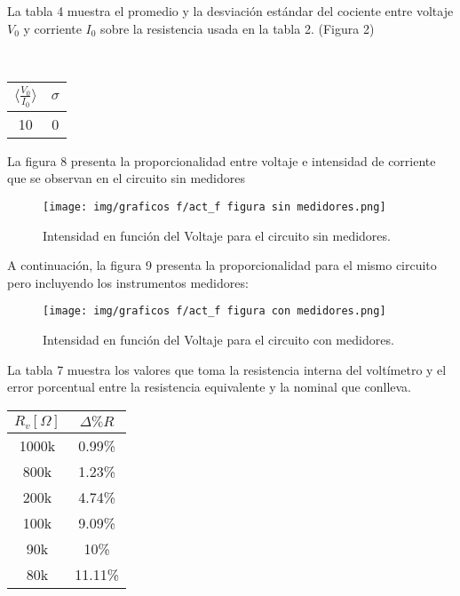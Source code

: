 \documentclass[letterpaper,11pt]{article} %
\begin{document}
La tabla 4 muestra el promedio y la desviación estándar del cociente entre voltaje $V_0$ y corriente $I_0$ sobre la resistencia usada en la tabla 2. (Figura 2)
\begin{center}
\vspace*{1mm} \\
\begin{tabular}{|c|c|}
\hline
$\langle \frac{V_0}{I_0}\rangle$ & $\sigma$ \\ \hline
10                               & 0        \\ \hline
\end{tabular}
\end{center}

La figura 8 presenta la proporcionalidad entre voltaje e intensidad de corriente que se observan en el circuito sin medidores
\begin{figure}
    \centering
    \texttt{[image: img/graficos f/act\_f figura sin medidores.png]}
    
    \caption{Intensidad en función del Voltaje para el circuito sin medidores.}
    \label{fig:my_label}
\end{figure}

A continuación, la figura 9 presenta la proporcionalidad para el mismo circuito pero incluyendo los instrumentos medidores:
\begin{figure}
    \centering
    \texttt{[image: img/graficos f/act\_f figura con medidores.png]}
    
    \caption{Intensidad en función del Voltaje para el circuito con medidores.}
    \label{fig:my_label}
\end{figure}


La tabla 7 muestra los valores que toma la resistencia interna del voltímetro y el error porcentual entre la resistencia equivalente y la nominal que conlleva.
\begin{center}
\begin{tabular}{|c|c|}
\hline
$R_v [\Omega]$ & $\Delta \% R$ \\ \hline
1000k          & 0.99\%       \\ \hline
800k           & 1.23\%       \\ \hline
200k           & 4.74\%       \\ \hline
100k           & 9.09\%       \\ \hline
90k            & 10\%         \\ \hline
80k            & 11.11\%      \\ \hline
\end{tabular}
\end{center}{}
\end{document}
